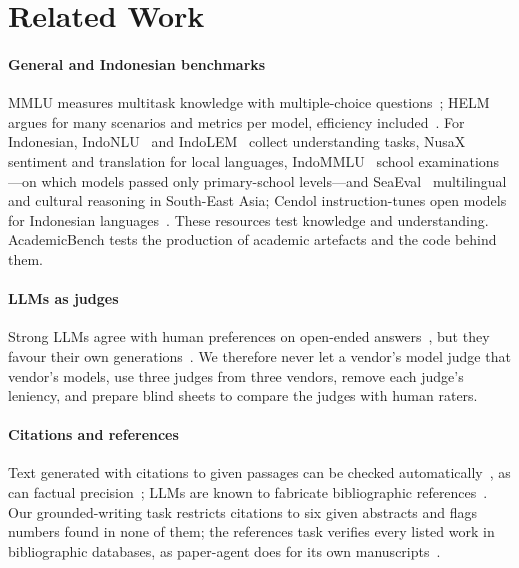 \section{Related Work}
\label{sec:related}

\paragraph{General and Indonesian benchmarks} MMLU measures multitask knowledge with multiple-choice questions~\cite{hendrycks2021mmlu}; HELM argues for many scenarios and metrics per model, efficiency included~\cite{liang2023helm}. For Indonesian, IndoNLU~\cite{wilie2020indonlu} and IndoLEM~\cite{koto2020indolem} collect understanding tasks, NusaX~\cite{winata2023nusax} sentiment and translation for local languages, IndoMMLU~\cite{koto2023indommlu} school examinations---on which models passed only primary-school levels---and SeaEval~\cite{wang2024seaeval} multilingual and cultural reasoning in South-East Asia; Cendol instruction-tunes open models for Indonesian languages~\cite{cahyawijaya2024cendol}. These resources test knowledge and understanding. AcademicBench tests the production of academic artefacts and the code behind them.

\paragraph{LLMs as judges} Strong LLMs agree with human preferences on open-ended answers~\cite{zheng2023judging,liu2023geval,chiang2023human}, but they favour their own generations~\cite{panickssery2024selfpref}. We therefore never let a vendor's model judge that vendor's models, use three judges from three vendors, remove each judge's leniency, and prepare blind sheets to compare the judges with human raters.

\paragraph{Citations and references} Text generated with citations to given passages can be checked automatically~\cite{gao2023alce}, as can factual precision~\cite{min2023factscore}; LLMs are known to fabricate bibliographic references~\cite{walters2023fabrication,huang2025hallucination}. Our grounded-writing task restricts citations to six given abstracts and flags numbers found in none of them; the references task verifies every listed work in bibliographic databases, as paper-agent does for its own manuscripts~\cite{arya2026paperagent}.

